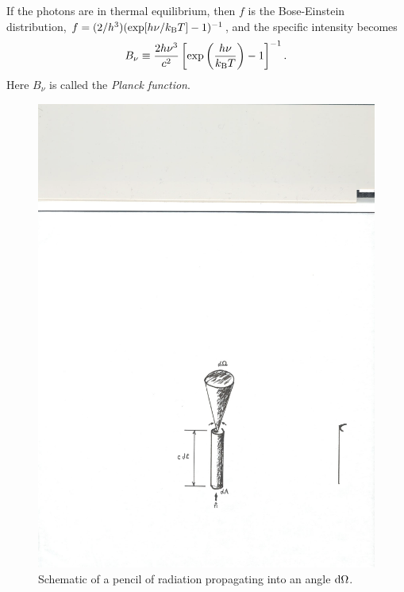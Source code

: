 If the photons are in thermal equilibrium, then $f$ is the Bose-Einstein distribution, $f = (2/h^{3})(\exp[h\nu/k_\mathrm{B} T]-1)^{-1}$, and the specific intensity becomes
\begin{equation}\label{e.Bnu}
B_{\nu} \equiv \frac{2 h\nu^{3}}{c^{2}} \left[\exp\left(\frac{h\nu}{k_\mathrm{B} T}\right)-1\right]^{-1}.
\end{equation}
Here $B_{\nu}$ is called the \emph{Planck function}.

\begin{figure}[htbp]
\centering\includegraphics{Figures/intensity-schematic}
\caption{\label{f.intensity-schematic}Schematic of a pencil of radiation propagating into an angle $\mathrm{d}\Omega$.}
\end{figure}

